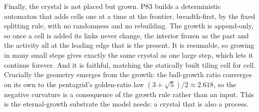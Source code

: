 Finally, the crystal is not placed but grown. P83 builds a deterministic automaton that adds cells
one at a time at the frontier, breadth-first, by the fixed splitting rule, with no randomness and no
rebuilding. The growth is append-only, so once a cell is added its links never change, the interior
frozen as the past and the activity all at the leading edge that is the present. It is resumable, so
growing in many small steps gives exactly the same crystal as one large step, which lets it continue
forever. And it is faithful, matching the statically built tiling cell for cell. Crucially the
geometry emerges from the growth: the ball-growth ratio converges on its own to the pentagrid's
golden-ratio law $(3+\sqrt 5)/2 \approx 2.618$, so the negative curvature is a consequence of the
growth rule rather than an input. This is the eternal-growth substrate the model needs: a crystal
that is also a process.

